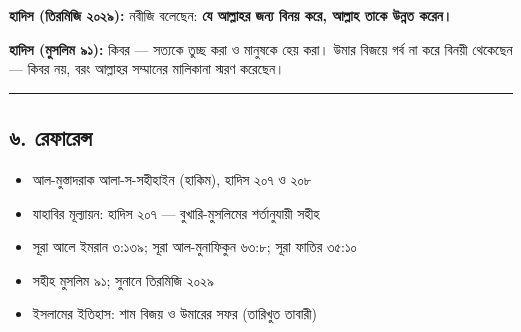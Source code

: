 \textbf{হাদিস (তিরমিজি ২০২৯):} নবীজি বলেছেন: \textbf{যে আল্লাহর জন্য বিনয় করে, আল্লাহ তাকে উন্নত করেন।}

\textbf{হাদিস (মুসলিম ৯১):} কিবর — সত্যকে তুচ্ছ করা ও মানুষকে হেয় করা। উমার বিজয়ে গর্ব না করে বিনয়ী থেকেছেন — কিবর নয়, বরং আল্লাহর সম্মানের মালিকানা স্মরণ করেছেন।

\medskip\hrule\medskip

\subsection*{৬. রেফারেন্স}

\begin{itemize}
\item আল-মুস্তাদরাক আলা-স-সহীহাইন (হাকিম), হাদিস ২০৭ ও ২০৮
\item যাহাবির মূল্যায়ন: হাদিস ২০৭ — বুখারি-মুসলিমের শর্তানুযায়ী সহীহ
\item সূরা আলে ইমরান ৩:১৩৯; সূরা আল-মুনাফিকুন ৬৩:৮; সূরা ফাতির ৩৫:১০
\item সহীহ মুসলিম ৯১; সুনানে তিরমিজি ২০২৯
\item ইসলামের ইতিহাস: শাম বিজয় ও উমারের সফর (তারিখুত তাবারী)
\end{itemize}


